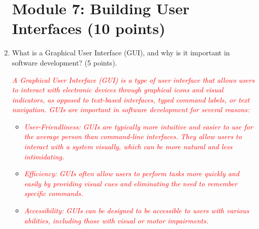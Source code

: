 \documentclass{article}
\begin{document}
\begin{enumerate}
\section{Module 7: Building User Interfaces (10 points)}
        \item What is a Graphical User Interface (GUI), and why is it important in
        software development? (5 points). \par
        \textcolor{red}{\textit{A Graphical User Interface (GUI) is a type of user interface that allows users to interact with electronic devices through graphical icons and visual indicators,
         as opposed to text-based interfaces, typed command labels, or text navigation.
         GUIs are important in software development for several reasons:}}
         \begin{itemize}
            \item \textcolor{red}{\textit{User-Friendliness: GUIs are typically more intuitive and easier to use for the average person than command-line interfaces. 
            They allow users to interact with a system visually, which can be more natural and less intimidating.}}
            \item \textcolor{red}{\textit{Efficiency: GUIs often allow users to perform tasks more quickly and easily 
            by providing visual cues and eliminating the need to remember specific commands.}}
            \item \textcolor{red}{\textit{Accessibility: GUIs can be designed to be accessible to users with various abilities, including those with visual or motor impairments.}}
         \end{itemize}


\end{enumerate}
\end{document}
